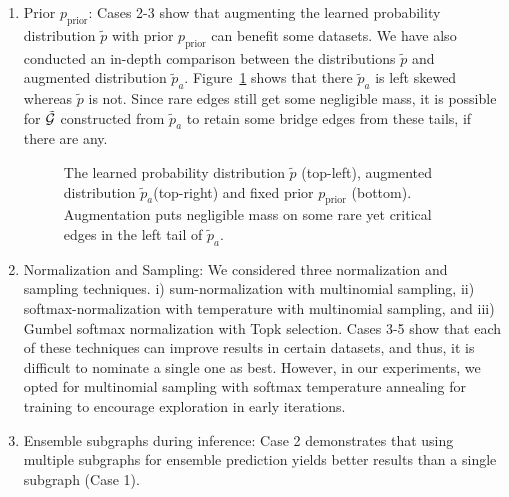 \begin{enumerate}
    \item Prior $p_\mathrm{prior}$: Cases 2-3 show that augmenting the learned probability distribution $\tilde{p}$ with prior $p_\mathrm{prior}$ can benefit some datasets. We have also conducted an in-depth comparison between the distributions $\tilde{p}$ and augmented distribution $\tilde{p}_a$. Figure~\ref{fig:augment_p} shows that there $\tilde{p}_a$ is left skewed whereas $\tilde{p}$ is not. Since rare edges still get some negligible mass, it is possible for $\tilde{{\mathcal{G}}}$ constructed from $\tilde{p}_a$ to retain some bridge edges from these tails, if there are any. 
    
\begin{figure}[!htbp]
    \centering
    \caption{The learned probability distribution $\tilde{p}$ (top-left), augmented distribution $\tilde{p}_a$(top-right) and fixed prior $p_\mathrm{prior}$ (bottom). Augmentation puts negligible mass on some rare yet critical edges in the left tail of $\tilde{p}_a$.}
    \label{fig:augment_p}
\end{figure}
    \item Normalization and Sampling: We considered three normalization and sampling techniques. i) sum-normalization with multinomial sampling, ii) softmax-normalization with temperature with multinomial sampling, and iii) Gumbel softmax normalization with Topk selection. Cases 3-5 show that each of these techniques can improve results in certain datasets, and thus, it is difficult to nominate a single one as best. However, in our experiments, we opted for multinomial sampling with softmax temperature annealing for training to encourage exploration in early iterations.

    \item Ensemble subgraphs during inference: Case 2 demonstrates that using multiple subgraphs for ensemble prediction yields better results than a single subgraph (Case 1).    
\end{enumerate}

